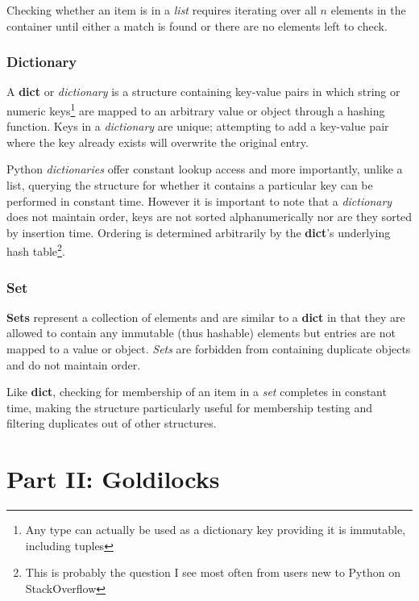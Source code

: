 Checking whether an item is in a \textit{list} requires iterating over all $n$
elements in the container until either a match is found or there are no elements
left to check.


\subsubsection{Dictionary}

A \textbf{dict}\citep{py-dict} or \textit{dictionary} is a structure containing
key-value pairs in which string or numeric keys\footnote{Any type can actually
be used as a dictionary key providing it is immutable, including
tuples\citep{py-dict}} are mapped to an arbitrary value or object through a
hashing function. Keys in a \textit{dictionary} are unique; attempting to add a
key-value pair where the key already exists will overwrite the original entry.

Python \textit{dictionaries} offer constant lookup access and more importantly,
unlike a list, querying the structure for whether it contains a particular key
can be performed in constant time\citep{py:timecomplexity}.
However it is important to note that a \textit{dictionary} does not maintain
order, keys are not sorted alphanumerically nor are they sorted by insertion
time. Ordering is determined arbitrarily by the \textbf{dict}'s underlying hash
table\footnote{This is probably the question I see most often from users new to
Python on StackOverflow}.


\subsubsection{Set}

\textbf{Sets}\citep{py-set} represent a collection of elements and are similar
to a \textbf{dict} in that they are allowed to contain any immutable (thus
hashable) elements but entries are not mapped to a value or object.
\textit{Sets} are forbidden from containing duplicate objects and do not
maintain order.

Like \textbf{dict}, checking for membership of an item in a \textit{set}
completes in constant time, making the structure particularly useful for
membership testing and filtering duplicates out of other structures.



\section{Part II: Goldilocks}
\label{app:concepts-p2-1}
